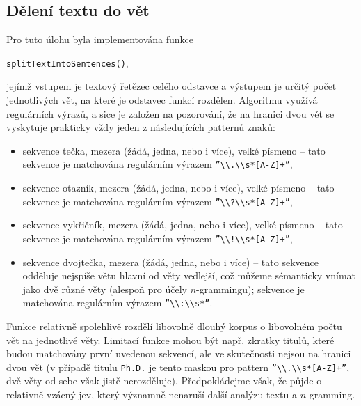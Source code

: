 \subsection{Dělení textu do vět}

Pro tuto úlohu byla implementována funkce 

\begin{center}
\texttt{splitTextIntoSentences()},
\end{center}

jejímž vstupem je textový řetězec celého odstavce a výstupem je určitý počet jednotlivých vět, na které je odstavec funkcí rozdělen. Algoritmu využívá regulárních výrazů, a sice je založen na pozorování, že na hranici dvou vět se vyskytuje prakticky vždy jeden z následujících patternů znaků:

\begin{itemize}
  \item sekvence tečka, mezera (žádá, jedna, nebo i více), velké písmeno -- tato sekvence je matchována regulárním výrazem \texttt{''\textbackslash \textbackslash .\textbackslash \textbackslash s*[A-Z]+''},
  \item sekvence otazník, mezera (žádá, jedna, nebo i více), velké písmeno -- tato sekvence je matchována regulárním výrazem \texttt{''\textbackslash \textbackslash ?\textbackslash \textbackslash s*[A-Z]+''},
  \item sekvence vykřičník, mezera (žádá, jedna, nebo i více), velké písmeno -- tato sekvence je matchována regulárním výrazem \texttt{''\textbackslash \textbackslash !\textbackslash \textbackslash s*[A-Z]+''},
  \item sekvence dvojtečka, mezera (žádá, jedna, nebo i více) -- tato sekvence odděluje nejspíše větu hlavní od věty vedlejší, což můžeme sémanticky vnímat jako dvě různé věty (alespoň pro účely $n$-grammingu); sekvence je matchována regulárním výrazem \texttt{''\textbackslash \textbackslash :\textbackslash \textbackslash s*''}.
\end{itemize}

Funkce relativně spolehlivě rozdělí libovolně dlouhý korpus o libovolném počtu vět na jednotlivé věty. Limitací funkce mohou být např. zkratky titulů, které budou matchovány první uvedenou sekvencí, ale ve skutečnosti nejsou na hranici dvou vět (v případě titulu \texttt{Ph.D.} je tento maskou pro pattern \texttt{''\textbackslash \textbackslash .\textbackslash \textbackslash s*[A-Z]+''}, dvě věty od sebe však jistě nerozděluje). Předpokládejme však, že půjde o relativně vzácný jev, který významně nenaruší další analýzu textu a $n$-gramming.

